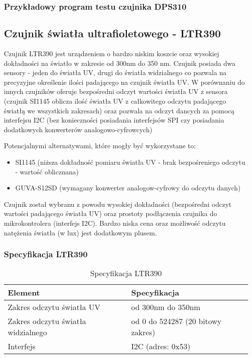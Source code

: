 \documentclass[12pt,a4paper]{article}
\begin{document}
\subsubsection{Przykładowy program testu czujnika DPS310}

\begin{code}[H]

    \caption{Test czujnika DPS310}
\end{code}

\subsection{Czujnik światła ultrafioletowego - LTR390}

Czujnik LTR390 jest urządzeniem o bardzo niskim koszcie oraz wysokiej dokładności na światło w zakresie od 300nm do 350 nm. Czujnik posiada dwa sensory - jeden do światła UV, drugi do światła widzialnego 
co pozwala na precyzyjne określenie ilości padającego na czujnik światła UV. W porównaniu do innych czujników oferuje bezpośredni odczyt wartości światła UV z sensora (czujnik SI1145 oblicza ilość światła UV z całkowitego odczytu padającego światłą we wszystkich zakresach) 
oraz pozwala na odczyt dancych za pomocą interfejsu I2C (bez konieczności posiadania interfejsów SPI czy posiadania dodatkowych konwerterów analogowo-cyfrowcych) 

Potencjalnymi alternatywami, które mogły być wykorzystane to:
\begin{itemize}
    \item SI1145 (niższa dokładność pomiaru światła UV - brak bezpośreniego odczytu - wartość oblicznana)
    \item GUVA-S12SD (wymagany konwerter analogow-cyfrowy do odczytu danych)
\end{itemize}

Czujnik został wybranu z powodu wysokiej dokładności (bezpośredni odczyt wartości padającego światła UV) oraz prostoty podłączenia czujnika do mikrokontrolera (interfejs I2C). 
Bardzo niska cena oraz możliwość odczytu natężenia światła (w lux) jest dodatkowym plusem.

\subsubsection{Specyfikacja LTR390}

\begin{table}[H]
    \centering
    \begin{tabular}{|l|l|}
        \hline
        Element & Specyfikacja \\
        \hline
        Zakres odczytu światła UV & od 300nm do 350nm \\
        \hline
        Zakres odczytu światła widzialnego & od 0 do 524287 (20 bitowy zakres) \\
        \hline
        Interfejs & I2C (adres: 0x53) \\
        \hline
    \end{tabular}
    \caption{Specyfikacja LTR390}
    \label{ltr390-spec}
\end{table}
\end{document}
